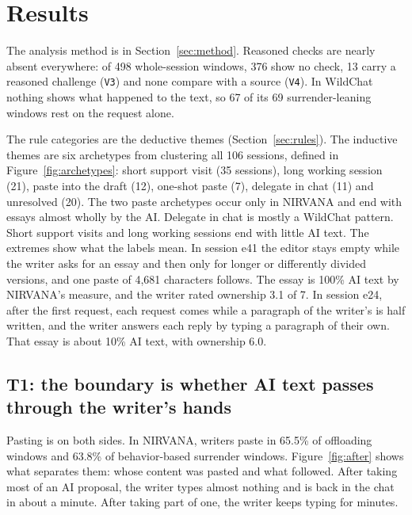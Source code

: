 \documentclass[manuscript,screen]{acmart}
\newcommand{\code}[1]{\texttt{#1}}
\begin{document}
\section{Results}
\label{sec:results}

The analysis method is in Section~\ref{sec:method}. Reasoned checks are nearly absent everywhere: of 498 whole-session windows, 376 show no check, 13 carry a reasoned challenge (\code{V3}) and none compare with a source (\code{V4}). In WildChat nothing shows what happened to the text, so 67 of its 69 surrender-leaning windows rest on the request alone.

The rule categories are the deductive themes (Section~\ref{sec:rules}). The inductive themes are six archetypes from clustering all 106 sessions, defined in Figure~\ref{fig:archetypes}: short support visit (35 sessions), long working session (21), paste into the draft (12), one-shot paste (7), delegate in chat (11) and unresolved (20). The two paste archetypes occur only in NIRVANA and end with essays almost wholly by the AI. Delegate in chat is mostly a WildChat pattern. Short support visits and long working sessions end with little AI text. The extremes show what the labels mean. In session e41 the editor stays empty while the writer asks for an essay and then only for longer or differently divided versions, and one paste of 4,681 characters follows. The essay is 100\% AI text by NIRVANA's measure, and the writer rated ownership 3.1 of 7. In session e24, after the first request, each request comes while a paragraph of the writer's is half written, and the writer answers each reply by typing a paragraph of their own. That essay is about 10\% AI text, with ownership 6.0.

\subsection{T1: the boundary is whether AI text passes through the writer's hands}

Pasting is on both sides. In NIRVANA, writers paste in 65.5\% of offloading windows and 63.8\% of behavior-based surrender windows. Figure~\ref{fig:after} shows what separates them: whose content was pasted and what followed. After taking most of an AI proposal, the writer types almost nothing and is back in the chat in about a minute. After taking part of one, the writer keeps typing for minutes.
\end{document}
